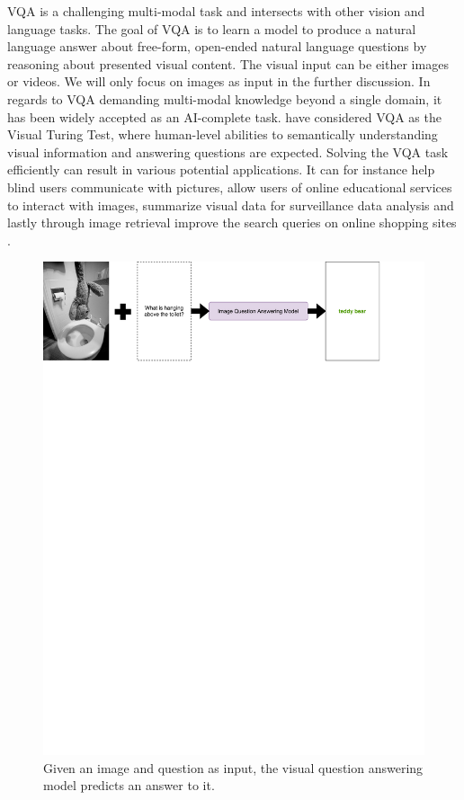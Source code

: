 \documentclass{article}
\begin{document}
VQA is a challenging multi-modal task and intersects with other vision and language tasks. The goal of VQA is to learn a model to produce a natural language answer about free-form, open-ended natural language questions by reasoning about presented visual content. The visual input can be either images or videos. We will only focus on images as input in the further discussion. In regards to VQA demanding multi-modal knowledge beyond a single domain, it has been widely accepted as an AI-complete task. \citet{geman2015visual} have considered VQA as the Visual Turing Test, where human-level abilities to semantically understanding visual information and answering questions are expected. Solving the VQA task efficiently can result in various potential applications. It can for instance help blind users communicate with pictures, allow users of online educational services to interact with images, summarize visual data for surveillance data analysis and lastly through image retrieval improve the search queries on online shopping sites \citep{manmadhan2020vqa}.

\begin{figure}[H]
	\centering
	\includegraphics[width=\linewidth]{vqa_teddy.pdf}
	\caption{Given an image and question as input, the visual question answering model predicts an answer to it.}
	\label{fig:vqa-graph}
\end{figure}
\end{document}
